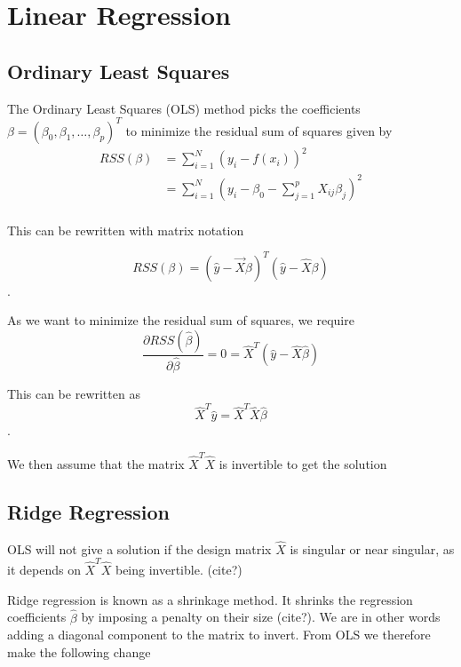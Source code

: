 \section{Linear Regression}

\subsection{Ordinary Least Squares}\label{section:ols}
The Ordinary Least Squares (OLS) method picks the coefficients
\(\beta = (\beta_0, \beta_1, \dots, \beta_p)^T\) to minimize the
residual sum of squares given by
\begin{align}
	RSS(\beta) &= \sum\limits_{i=1}^N (y_i - f(x_i))^2\\
				&= \sum\limits_{i=1}^N
				(y_i - \beta_0 - \sum\limits_{j=1}^p X_{ij}\beta_j )^2\\
\end{align}

This can be rewritten with matrix notation

\begin{equation}
	RSS(\beta) = (\hat{y}-\vec{X}\beta)^T(\hat{y} - \hat{X}\beta)
\end{equation}. ~\cite{James2000}

As we want to minimize the residual sum of squares, we require
\begin{equation}
	\frac{\partial RSS(\hat{\beta})}{\partial \hat{\beta}}
	= 0
	= \hat{X}^T(\hat{y} - \hat{X}\hat{\beta})
\end{equation}

This can be rewritten as
\begin{equation}
	\hat{X}^T\hat{y} = \hat{X}^T\hat{X}\hat{\beta}
\end{equation}.

We then assume that the matrix \(\hat{X}^T\hat{X}\)
is invertible to get the solution

\subsection{Ridge Regression}\label{section:ridge}
OLS will not give a solution if the design matrix \(\hat{X}\) is singular
or near singular, as it depends on \(\hat{X}^T\hat{X}\) being invertible. (cite?)

Ridge regression is known as a shrinkage method. It shrinks the regression
coefficients \(\hat{\beta}\) by imposing a penalty on their size (cite?). We are in other words adding a diagonal component
to the matrix to invert. From OLS we therefore make the following change

